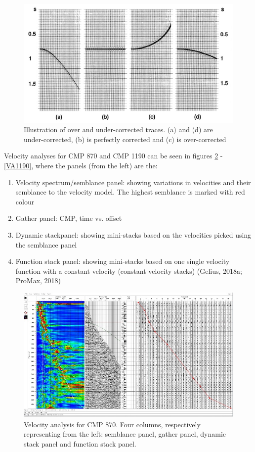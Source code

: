 \documentclass[10pt,a4paper]{article}
\begin{document}
\begin{figure}[H]
\includegraphics[width=\textwidth]{NMOcorr_over_under.jpg}
\caption{Illustration of over and under-corrected traces. (a) and (d) are under-corrected, (b) is perfectly corrected and (c) is over-corrected}
\label{NMOoverunder}
\end{figure}

\noindent Velocity analyses for CMP 870 and CMP 1190 can be seen in figures \ref{VA870} - \ref{VA1190}, where the panels (from the left) are the:

\begin{enumerate}
    \item Velocity spectrum/semblance panel: showing variations in velocities and their semblance to the velocity model. The highest semblance is marked with red colour
    \item Gather panel: CMP, time vs. offset
    \item Dynamic stackpanel: showing mini-stacks based on the velocities picked using the semblance panel
    \item Function stack panel: showing mini-stacks based on one single velocity function with a constant velocity (constant velocity stacks) (Gelius, 2018a; ProMax, 2018)
\end{enumerate}

\begin{figure}[H]
\includegraphics[width=\textwidth]{Velo_anal_870.jpg}
\caption{Velocity analysis for CMP 870. Four columns, respectively representing from the left: semblance panel, gather panel, dynamic stack panel and function stack panel.}
\label{VA870}
\end{figure}
\end{document}
